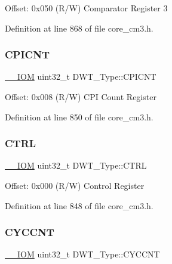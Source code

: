 Offset\+: 0x050 (R/W) Comparator Register 3 

Definition at line 868 of file core\+\_\+cm3.\+h.

\mbox{\label{struct_d_w_t___type_a2c08096c82abe245c0fa97badc458154}} 
\subsubsection{\texorpdfstring{C\+P\+I\+C\+NT}{CPICNT}}
{\footnotesize\ttfamily \hyperlink{core__sc300_8h_ab6caba5853a60a17e8e04499b52bf691}{\+\_\+\+\_\+\+I\+OM} uint32\+\_\+t D\+W\+T\+\_\+\+Type\+::\+C\+P\+I\+C\+NT}

Offset\+: 0x008 (R/W) C\+PI Count Register 

Definition at line 850 of file core\+\_\+cm3.\+h.

\mbox{\label{struct_d_w_t___type_add790c53410023b3b581919bb681fe2a}} 
\subsubsection{\texorpdfstring{C\+T\+RL}{CTRL}}
{\footnotesize\ttfamily \hyperlink{core__sc300_8h_ab6caba5853a60a17e8e04499b52bf691}{\+\_\+\+\_\+\+I\+OM} uint32\+\_\+t D\+W\+T\+\_\+\+Type\+::\+C\+T\+RL}

Offset\+: 0x000 (R/W) Control Register 

Definition at line 848 of file core\+\_\+cm3.\+h.

\mbox{\label{struct_d_w_t___type_a102eaa529d9098242851cb57c52b42d9}} 
\subsubsection{\texorpdfstring{C\+Y\+C\+C\+NT}{CYCCNT}}
{\footnotesize\ttfamily \hyperlink{core__sc300_8h_ab6caba5853a60a17e8e04499b52bf691}{\+\_\+\+\_\+\+I\+OM} uint32\+\_\+t D\+W\+T\+\_\+\+Type\+::\+C\+Y\+C\+C\+NT}

